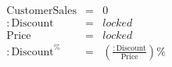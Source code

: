 \documentclass{article}
\begin{document}
\begin{eqnarray*}
\mathrm{CustomerSales}&=&0\\
\mathrm{:Discount}&=&locked\\
\mathrm{Price}&=&locked\\
\mathrm{:Discount}^{\%}&=&\left(\frac{\mathrm{:Discount}}{\mathrm{Price}}\right)\%\\
\end{eqnarray*}
\end{document}
